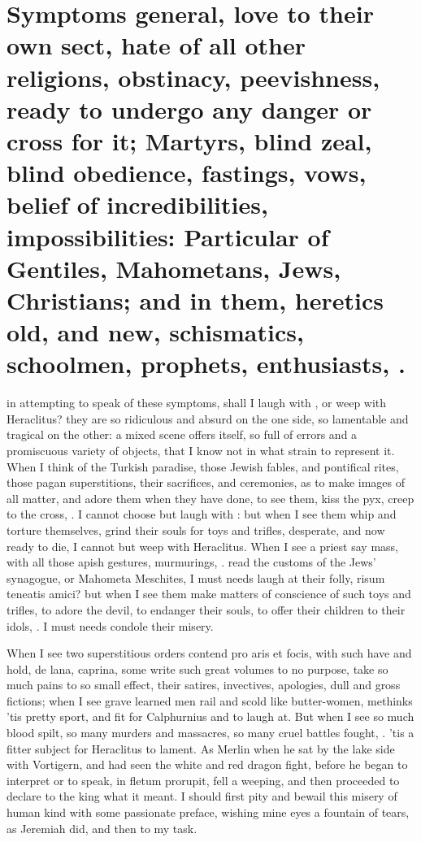 {%
\section[Symptoms general]{Symptoms general, love to their own sect, hate of all other religions, obstinacy, peevishness, ready to undergo any danger or cross for it; Martyrs, blind zeal, blind obedience, fastings, vows, belief of incredibilities, impossibilities: Particular of Gentiles, Mahometans, Jews, Christians; and in them, heretics old, and new, schismatics, schoolmen, prophets, enthusiasts, \etc{}.}

 in attempting to speak of these
symptoms, shall I laugh with \Democritus{}, or weep with Heraclitus? they
are so ridiculous and absurd on the one side, so lamentable and
tragical on the other: a mixed scene offers itself, so full of errors
and a promiscuous variety of objects, that I know not in what strain to
represent it. When I think of the Turkish paradise, those Jewish
fables, and pontifical rites, those pagan superstitions, their
sacrifices, and ceremonies, as to make images of all matter, and adore
them when they have done, to see them, kiss the pyx, creep to the
cross, \etc{}. I cannot choose but laugh with \Democritus{}: but when I see
them whip and torture themselves, grind their souls for toys and
trifles, desperate, and now ready to die, I cannot but weep with
Heraclitus. When I see a priest say mass, with all those apish
gestures, murmurings, \etc{}. read the customs of the Jews' synagogue, or
Mahometa Meschites, I must needs laugh at their folly, risum
teneatis amici? but when I see them make matters of conscience of such
toys and trifles, to adore the devil, to endanger their souls, to offer
their children to their idols, \etc{}. I must needs condole their misery.

When I see two superstitious orders contend pro aris et focis, with
such have and hold, de lana, caprina, some write such great volumes to
no purpose, take so much pains to so small effect, their satires,
invectives, apologies, dull and gross fictions; when I see grave
learned men rail and scold like butter-women, methinks 'tis pretty
sport, and fit for Calphurnius and \Democritus{} to laugh at. But
when I see so much blood spilt, so many murders and massacres, so many
cruel battles fought, \etc{}. 'tis a fitter subject for Heraclitus to
lament. As Merlin when he sat by the lake side with Vortigern,
and had seen the white and red dragon fight, before he began to
interpret or to speak, in fletum prorupit, fell a weeping, and then
proceeded to declare to the king what it meant. I should first pity and
bewail this misery of human kind with some passionate preface, wishing
mine eyes a fountain of tears, as Jeremiah did, and then to my task.

}
